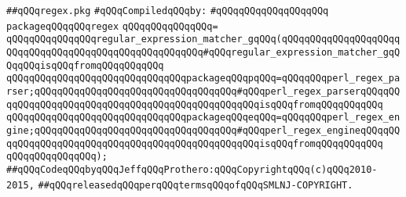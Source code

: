 \label{src/lib/regex/regex.pkg}
\verb|##qQQqregex.pkg|\newline
\newline
\verb|#qQQqCompiledqQQqby:|\newline
\verb|#qQQqqQQqqQQqqQQqqQQq|\newline
\newline
\verb|packageqQQqqQQqregex|\newline
\verb|qQQqqQQqqQQqqQQq=|\newline
\verb|qQQqqQQqqQQqqQQqregular_expression_matcher_gqQQq(qQQqqQQqqQQqqQQqqQQqqQQqqQQqqQQqqQQqqQQqqQQqqQQqqQQqqQQq#qQQqregular_expression_matcher_gqQQqqQQqisqQQqfromqQQqqQQqqQQq|\newline
\verb|qQQqqQQqqQQqqQQqqQQqqQQqqQQqqQQqpackageqQQqpqQQq=qQQqqQQqperl_regex_parser;qQQqqQQqqQQqqQQqqQQqqQQqqQQqqQQqqQQq#qQQqperl_regex_parserqQQqqQQqqQQqqQQqqQQqqQQqqQQqqQQqqQQqqQQqqQQqqQQqqQQqisqQQqfromqQQqqQQqqQQq|\newline
\verb|qQQqqQQqqQQqqQQqqQQqqQQqqQQqqQQqpackageqQQqeqQQq=qQQqqQQqperl_regex_engine;qQQqqQQqqQQqqQQqqQQqqQQqqQQqqQQqqQQq#qQQqperl_regex_engineqQQqqQQqqQQqqQQqqQQqqQQqqQQqqQQqqQQqqQQqqQQqqQQqqQQqisqQQqfromqQQqqQQqqQQq|\newline
\verb|qQQqqQQqqQQqqQQq);|\newline
\newline
\newline
\newline
\verb|##qQQqCodeqQQqbyqQQqJeffqQQqProthero:qQQqCopyrightqQQq(c)qQQq2010-2015,|\newline
\verb|##qQQqreleasedqQQqperqQQqtermsqQQqofqQQqSMLNJ-COPYRIGHT.|\newline

